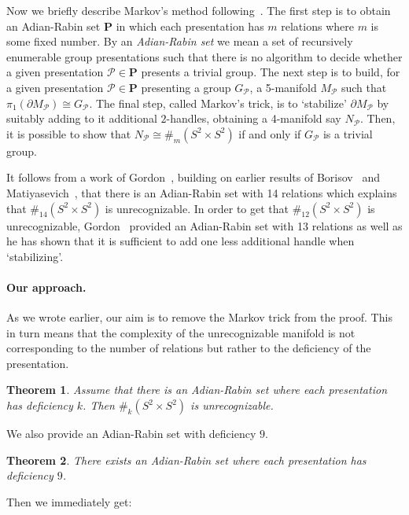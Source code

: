 \documentclass[10pt,a4paper]{article}
\newtheorem{theorem}{Theorem}
\theoremstyle{definition}
\theoremstyle{remark}
\newcommand\PP{\mathcal{P}}
\newcommand\bP{\mathbf{P}}
\begin{document}
Now we briefly describe Markov's method
following~\cite{chernavsky-leksine06, kirby20, gordon21}. The first step
is to
obtain an Adian-Rabin set $\bP$ in which each presentation has $m$
relations where $m$ is some fixed number. By
an \emph{Adian-Rabin set} we mean a set of recursively enumerable group presentations such
that there is no algorithm to decide whether a given presentation $\PP \in
\bP$ presents a trivial group.  The next step is to build, for a given
presentation $\PP \in \bP$ presenting a group $G_{\PP}$, a 5-manifold $M_{\PP}$ such that
$\pi_1(\partial M_{\PP}) \cong G_{\PP}$. The final step, called Markov's trick, is to
`stabilize' $\partial M_{\PP}$ by suitably adding to it additional $2$-handles,
obtaining a 4-manifold say $N_{\PP}$. Then, it is possible to show that $N_{\PP} \cong
\#_m(S^2 \times S^2)$ if and only if $G_{\PP}$ is a trivial group.

It follows from a work of Gordon~\cite{gordon95}, building on earlier results
of Borisov~\cite{borisov69} and Matiyasevich~\cite{matiyasevich67}, that there is an Adian-Rabin set with 14 relations which explains that
$\#_{14}(S^2 \times S^2)$ is unrecognizable. In order to get that $\#_{12}(S^2
\times S^2)$ is unrecognizable, Gordon~\cite{gordon21} provided an Adian-Rabin
set with 13 relations as well as he has shown that it is sufficient to add one
less additional handle when `stabilizing'.


\paragraph{Our approach.}
As we wrote earlier, our aim is to remove the Markov trick from the proof. This
in turn means that the complexity of the unrecognizable manifold is not
corresponding to the number of relations but rather to the deficiency of the
presentation.

\begin{theorem}
\label{t:no_markov}
  Assume that there is an Adian-Rabin set where each presentation has deficiency $k$. Then $\#_k(S^2 \times S^2)$ is unrecognizable. 
\end{theorem}

We also provide an Adian-Rabin set with deficiency $9$.

\begin{theorem}
\label{t:def9}
  There exists an Adian-Rabin set where each presentation has deficiency $9$.
\end{theorem}

Then we immediately get:
\end{document}
